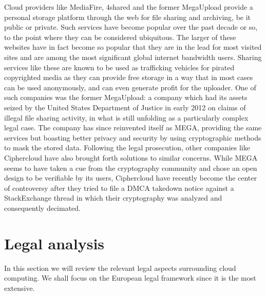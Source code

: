 \documentclass[11pt]{article}
\begin{document}

Cloud providers like MediaFire, 4shared and the former MegaUpload provide a personal storage platform through the web for file sharing and archiving, be it public or private.
Such services have become popular over the past decade or so, to the point where they can be considered ubiquitous.
The larger of these websites have in fact become so popular that they are in the lead for most visited sites and are among the most significant global internet bandwidth users.
Sharing services like these are known to be used as trafficking vehicles for pirated copyrighted media as they can provide free storage in a way that in most cases can be used anonymously, and can even generate profit for the uploader.
One of such companies was the former MegaUpload: a company which had its assets seized by the United States Department of Justice in early 2012 on claims of illegal file sharing activity, in what is still unfolding as a particularly complex legal case.
The company has since reinvented itself as MEGA, providing the same services but boasting better privacy and security by using cryptographic methods to mask the stored data.
Following the legal prosecution, other companies like Ciphercloud have also brought forth solutions to similar concerns.
While MEGA seems to have taken a cue from the cryptography community and chose an open design to be verifiable by its users, Ciphercloud have recently become the center of controversy after they tried to file a DMCA takedown notice against a StackExchange thread in which their cryptography was analyzed and consequently decimated.


\section{Legal analysis}
\label{sec:legal_analysis}

In this section we will review the relevant legal aspects surrounding cloud computing. We shall focus on the European legal framework since it is the most extensive.
\end{document}
